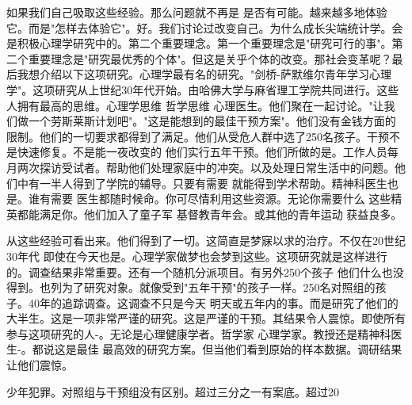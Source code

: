 如果我们自己吸取这些经验。那么问题就不再是 是否有可能。越来越多地体验它。而是"怎样去体验它"。好。我们讨论过改变自己。为什么成长尖端统计学。会是积极心理学研究中的。第二个重要理念。第一个重要理念是"研究可行的事"。第二个重要理念是"研究最优秀的个体"。但这是关乎个体的改变。那社会变革呢？最后我想介绍以下这项研究。心理学最有名的研究。"剑桥-萨默维尔青年学习心理学"。这项研究从上世纪30年代开始。由哈佛大学与麻省理工学院共同进行。这些人拥有最高的思维。心理学思维 哲学思维 心理医生。他们聚在一起讨论。"让我们做一个劳斯莱斯计划吧"。"这是能想到的最佳干预方案"。他们没有金钱方面的限制。他们的一切要求都得到了满足。他们从受危人群中选了250名孩子。干预不是快速修复。不是能一夜改变的 他们实行五年干预。他们所做的是。工作人员每月两次探访受试者。帮助他们处理家庭中的冲突。以及处理日常生活中的问题。他们中有一半人得到了学院的辅导。只要有需要 就能得到学术帮助。精神科医生也是。谁有需要 医生都随时候命。你可尽情利用这些资源。无论你需要什么 这些精英都能满足你。他们加入了童子军 基督教青年会。或其他的青年运动 获益良多。 

从这些经验可看出来。他们得到了一切。这简直是梦寐以求的治疗。不仅在20世纪30年代 即使在今天也是。心理学家做梦也会梦到这些。这项研究就是这样进行的。调查结果非常重要。还有一个随机分派项目。有另外250个孩子 他们什么也没得到。也列为了研究对象。就像受到"五年干预"的孩子一样。250名对照组的孩子。40年的追踪调查。这调查不只是今天 明天或五年内的事。而是研究了他们的大半生。这是一项非常严谨的研究。这是严谨的干预。其结果令人震惊。即使所有参与这项研究的人-。无论是心理健康学者。哲学家 心理学家。教授还是精神科医生-。都说这是最佳 最高效的研究方案。但当他们看到原始的样本数据。调研结果让他们震惊。 

少年犯罪。对照组与干预组没有区别。超过三分之一有案底。超过20%

